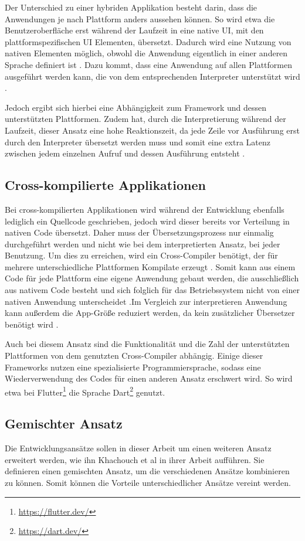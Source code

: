 Der Unterschied zu einer hybriden Applikation besteht darin, dass die Anwendungen je nach Plattform anders aussehen können. So wird etwa die Benutzeroberfläche erst während der Laufzeit in eine native UI, mit den plattformspezifischen UI Elementen, übersetzt.
Dadurch wird eine Nutzung von nativen Elementen möglich, obwohl die Anwendung eigentlich in einer anderen Sprache definiert ist \cite{IEEE_development_classes}. 
Dazu kommt, dass eine Anwendung auf allen Plattformen ausgeführt werden kann, die von dem entsprechenden Interpreter unterstützt wird \cite{server_side}.

Jedoch ergibt sich hierbei eine Abhängigkeit zum Framework und dessen unterstützten Plattformen. Zudem hat, durch die Interpretierung während der Laufzeit, dieser Ansatz eine hohe Reaktionszeit, da jede Zeile vor Ausführung erst durch den Interpreter übersetzt werden muss und somit eine extra Latenz zwischen jedem einzelnen Aufruf und dessen Ausführung entsteht \cite{server_side}.

\subsection{Cross-kompilierte Applikationen}
Bei cross-kompilierten Applikationen wird während der Entwicklung ebenfalls lediglich ein Quellcode geschrieben, jedoch wird dieser bereits vor Verteilung in nativen Code übersetzt. Daher muss der Übersetzungsprozess nur einmalig durchgeführt werden und nicht wie bei dem interpretierten Ansatz, bei jeder Benutzung. Um dies zu erreichen, wird ein Cross-Compiler benötigt, der für mehrere unterschiedliche Plattformen Kompilate erzeugt \cite{mobiledraft_cross_plattform}. Somit kann aus einem Code für jede Plattform eine eigene Anwendung gebaut werden, die ausschließlich aus nativem Code besteht und sich folglich für das Betriebssystem nicht von einer nativen Anwendung unterscheidet \cite{IEEE_development_classes}.Im Vergleich zur interpretieren Anwendung kann außerdem die App-Größe reduziert werden, da kein zusätzlicher Übersetzer benötigt wird \cite{mobiledraft_cross_plattform}.

Auch bei diesem Ansatz sind die Funktionalität und die Zahl der unterstützten Plattformen von dem genutzten Cross-Compiler abhängig. Einige dieser Frameworks nutzen eine spezialisierte Programmiersprache, sodass eine Wiederverwendung des Codes für einen anderen Ansatz erschwert wird. So wird etwa bei Flutter\footnote{\url{https://flutter.dev/}} die Sprache Dart\footnote{\url{https://dart.dev/}} genutzt.

\subsection{Gemischter Ansatz}
Die Entwicklungsansätze sollen in dieser Arbeit um einen weiteren Ansatz erweitert werden, wie ihn Khachouch et al \cite{IEEE_Khackouch_Al} in ihrer Arbeit aufführen. Sie definieren einen gemischten Ansatz, um die verschiedenen Ansätze kombinieren zu können. Somit können die Vorteile unterschiedlicher Ansätze vereint werden.
